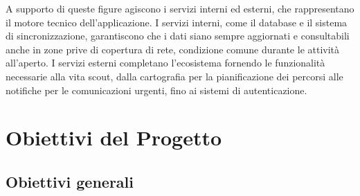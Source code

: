 \documentclass[11pt]{article}
\numberwithin{figure}{section}
\begin{document}
A supporto di queste figure agiscono i servizi interni ed esterni, che rappresentano il motore tecnico dell'applicazione. I servizi interni, come il database e il sistema di sincronizzazione, garantiscono che i dati siano sempre aggiornati e consultabili anche in zone prive di copertura di rete, condizione comune durante le attività all'aperto. I servizi esterni completano l'ecosistema fornendo le funzionalità necessarie alla vita scout, dalla cartografia per la pianificazione dei percorsi alle notifiche per le comunicazioni urgenti, fino ai sistemi di autenticazione.

\newpage

\section{Obiettivi del Progetto}
\subsection{Obiettivi generali}
\end{document}
